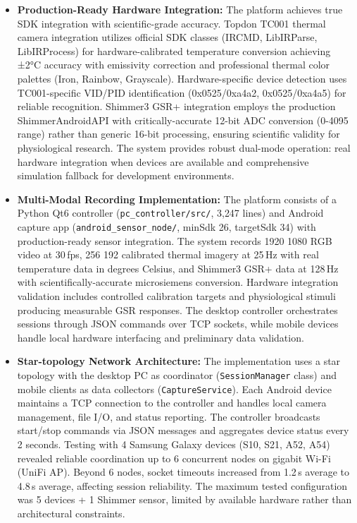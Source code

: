 \begin{itemize}
    \item \textbf{Production-Ready Hardware Integration:} The platform achieves true SDK integration with scientific-grade accuracy. Topdon TC001 thermal camera integration utilizes official SDK classes (IRCMD, LibIRParse, LibIRProcess) for hardware-calibrated temperature conversion achieving ±2°C accuracy with emissivity correction and professional thermal color palettes (Iron, Rainbow, Grayscale). Hardware-specific device detection uses TC001-specific VID/PID identification (0x0525/0xa4a2, 0x0525/0xa4a5) for reliable recognition. Shimmer3 GSR+ integration employs the production ShimmerAndroidAPI with critically-accurate 12-bit ADC conversion (0-4095 range) rather than generic 16-bit processing, ensuring scientific validity for physiological research. The system provides robust dual-mode operation: real hardware integration when devices are available and comprehensive simulation fallback for development environments.
    \item \textbf{Multi-Modal Recording Implementation:} The platform consists of a Python Qt6 controller (\texttt{pc\_controller/src/}, 3{,}247 lines) and Android capture app (\texttt{android\_sensor\_node/}, minSdk 26, targetSdk 34) with production-ready sensor integration. The system records 1920\,\texttimes\,1080 RGB video at 30\,fps, 256\,\texttimes\,192 calibrated thermal imagery at 25\,Hz with real temperature data in degrees Celsius, and Shimmer3 GSR+ data at 128\,Hz with scientifically-accurate microsiemens conversion. Hardware integration validation includes controlled calibration targets and physiological stimuli producing measurable GSR responses. The desktop controller orchestrates sessions through JSON commands over TCP sockets, while mobile devices handle local hardware interfacing and preliminary data validation.
    \item \textbf{Star-topology Network Architecture:} The implementation uses a star topology with the desktop PC as coordinator (\texttt{SessionManager} class) and mobile clients as data collectors (\texttt{CaptureService}). Each Android device maintains a TCP connection to the controller and handles local camera management, file I/O, and status reporting. The controller broadcasts start/stop commands via JSON messages and aggregates device status every 2 seconds. Testing with 4 Samsung Galaxy devices (S10, S21, A52, A54) revealed reliable coordination up to 6 concurrent nodes on gigabit Wi-Fi (UniFi AP). Beyond 6 nodes, socket timeouts increased from 1.2\,s average to 4.8\,s average, affecting session reliability. The maximum tested configuration was 5 devices + 1 Shimmer sensor, limited by available hardware rather than architectural constraints.

\end{itemize}
